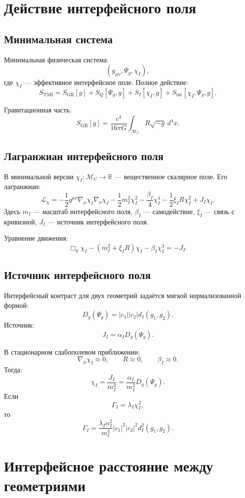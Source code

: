 \documentclass[12pt,a4paper]{article}
\newcommand{\M}{\mathcal M_U}
\newcommand{\Lag}{\mathcal L}
\begin{document}
\section{Действие интерфейсного поля}

\subsection{Минимальная система}

Минимальная физическая система:
\[
(g_{\mu\nu},\Psi_g,\chi_I),
\]
где \(\chi_I\) --- эффективное интерфейсное поле. Полное действие:
\[
S_{\mathrm{TMI}}
=
S_{\mathrm{GR}}[g]
+
S_Q[\Psi_g,g]
+
S_I[\chi_I,g]
+
S_{\mathrm{int}}[\chi_I,\Psi_g,g].
\]

Гравитационная часть:
\[
S_{\mathrm{GR}}[g]
=
\frac{c^4}{16\pi G}
\int_{\M}R\sqrt{-g}\,d^4x.
\]

\subsection{Лагранжиан интерфейсного поля}

В минимальной версии \(\chi_I:\M\to\mathbb R\) --- вещественное скалярное поле. Его лагранжиан:
\[
\Lag_\chi
=
-
\frac12g^{\mu\nu}\nabla_\mu\chi_I\nabla_\nu\chi_I
-
\frac12m_I^2\chi_I^2
-
\frac{\beta_I}{4}\chi_I^4
-
\frac12\xi_I R\chi_I^2
+
J_I\chi_I.
\]
Здесь \(m_I\) --- масштаб интерфейсного поля, \(\beta_I\) --- самодействие, \(\xi_I\) --- связь с кривизной, \(J_I\) --- источник интерфейсного поля.

Уравнение движения:
\[
\boxed{
\Box_g\chi_I
-
(m_I^2+\xi_I R)\chi_I
-
\beta_I\chi_I^3
=
-J_I.
}
\]

\subsection{Источник интерфейсного поля}

Интерфейсный контраст для двух геометрий задаётся мягкой нормализованной формой:
\[
D_g(\Psi_g)=|c_1||c_2|d_I(g_1,g_2).
\]
Источник:
\[
J_I=\alpha_I D_g(\Psi_g).
\]

В стационарном слабополевом приближении:
\[
\nabla_\mu\chi_I\approx0,
\qquad
R\approx0,
\qquad
\beta_I\approx0.
\]
Тогда:
\[
\chi_I=\frac{J_I}{m_I^2}=\frac{\alpha_I}{m_I^2}D_g(\Psi_g).
\]
Если
\[
\Gamma_I=\lambda_I\chi_I^2,
\]
то
\[
\boxed{
\Gamma_I
=
\frac{\lambda_I\alpha_I^2}{m_I^4}
|c_1|^2|c_2|^2d_I^2(g_1,g_2).
}
\]

\section{Интерфейсное расстояние между геометриями}
\end{document}
